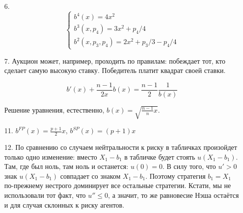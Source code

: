\begin{enumerate}

\item[6.] \begin{equation}
\begin{cases}
b^{4}(x)=4x^{2} \\
b^{3}(x,p_{4})=3x^{2}+p_{4}/4 \\
b^{2}(x,p_{3},p_{4})=2x^{2}+p_{3}/3-p_{4}/4
\end{cases}
\end{equation}

\item[7.] Аукцион может, например, проходить по правилам: побеждает тот, кто сделает самую высокую ставку. Победитель платит квадрат своей ставки.

\begin{equation}
b'(x)+\frac{n-1}{2x}b(x)=\frac{n-1}{2}\frac{1}{b(x)}
\end{equation}

Решение уравнения, естественно, $b(x)=\sqrt{\frac{n-1}{n}x}$.

\item[11.] $b^{FP}(x)=\frac{p+1}{2}x$, $b^{SP}(x)=(p+1)x$

\item[12.] По сравнению со случаем нейтральности к риску в табличках произойдет только одно изменение: вместо $ X_{1}-b_{1} $ в табличке будет стоять $ u(X_{1}-b_{1}) $. Там, где был ноль, там ноль и останется: $ u(0)=0 $. В силу того, что $ u'>0 $ знак $ u(X_{1}-b_{1}) $ совпадает со знаком $ X_{1}-b_{1} $. Поэтому стратегия $ b_{1}=X_{1} $ по-прежнему нестрого доминирует все остальные стратегии. Кстати, мы не использовали  тот факт, что $u''\leq 0 $, а значит, то же равновесие Нэша остаётся и для случая склонных к риску агентов.

\end{enumerate}
